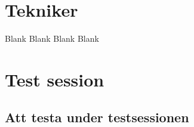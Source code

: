 
\appendix

\chapter{Tekniker}
\newpage
Blank
\newpage
Blank
\newpage
Blank
\newpage
Blank

\appendix

\chapter{Test session}

\section{Att testa under testsessionen}
